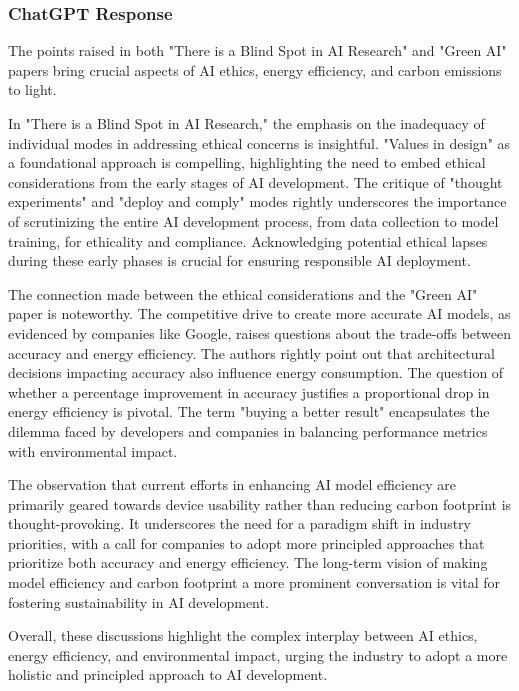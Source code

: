 \subsubsection{ChatGPT Response}

The points raised in both "There is a Blind Spot in AI Research" and "Green AI" papers bring crucial aspects of AI ethics, energy efficiency, and carbon emissions to light.

In "There is a Blind Spot in AI Research," the emphasis on the inadequacy of individual modes in addressing ethical concerns is insightful. "Values in design" as a foundational approach is compelling, highlighting the need to embed ethical considerations from the early stages of AI development. The critique of "thought experiments" and "deploy and comply" modes rightly underscores the importance of scrutinizing the entire AI development process, from data collection to model training, for ethicality and compliance. Acknowledging potential ethical lapses during these early phases is crucial for ensuring responsible AI deployment.

The connection made between the ethical considerations and the "Green AI" paper is noteworthy. The competitive drive to create more accurate AI models, as evidenced by companies like Google, raises questions about the trade-offs between accuracy and energy efficiency. The authors rightly point out that architectural decisions impacting accuracy also influence energy consumption. The question of whether a percentage improvement in accuracy justifies a proportional drop in energy efficiency is pivotal. The term "buying a better result" encapsulates the dilemma faced by developers and companies in balancing performance metrics with environmental impact.

The observation that current efforts in enhancing AI model efficiency are primarily geared towards device usability rather than reducing carbon footprint is thought-provoking. It underscores the need for a paradigm shift in industry priorities, with a call for companies to adopt more principled approaches that prioritize both accuracy and energy efficiency. The long-term vision of making model efficiency and carbon footprint a more prominent conversation is vital for fostering sustainability in AI development.

Overall, these discussions highlight the complex interplay between AI ethics, energy efficiency, and environmental impact, urging the industry to adopt a more holistic and principled approach to AI development.

